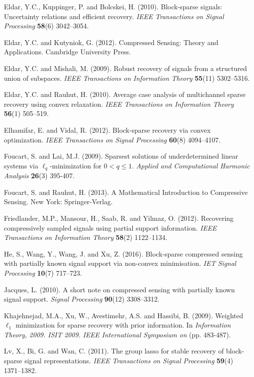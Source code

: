 \documentclass[11pt]{article}
\begin{document}
\begin{thebibliography}{}
	Eldar, Y.C., Kuppinger, P. and Bolcskei, H. (2010).
	Block-sparse signals: Uncertainty relations and efficient recovery. \textit{IEEE Transactions on Signal Processing}
	\textbf{58}(6) 3042--3054.
	
	Eldar, Y.C. and Kutyniok, G. (2012). Compressed Sensing: Theory and Applications. Cambridge University Press.
	
	Eldar, Y.C. and Mishali, M. (2009).
	Robust recovery of signals from a structured union of subspaces. \textit{IEEE Transactions on Information Theory}
	\textbf{55}(11) 5302--5316.
	
	Eldar, Y.C. and Rauhut, H. (2010). Average case analysis of multichannel sparse recovery using convex relaxation. \textit{IEEE Transactions on Information Theory} \textbf{56}(1) 505--519.
	
	Elhamifar, E. and Vidal, R. (2012). Block-sparse recovery via convex optimization. \textit{IEEE Transactions on Signal Processing}
	\textbf{60}(8) 4094--4107.
	
	Foucart, S. and Lai, M.J. (2009). Sparsest solutions of underdetermined linear systems via $\ell_q$-minimization for $0<q\leq1$. \textit{Applied and Computational Harmonic Analysis} 
	\textbf{26}(3) 395-407.
	
	Foucart, S. and Rauhut, H. (2013). A Mathematical Introduction to Compressive Sensing. New York: Springer-Verlag.
	
	Friedlander, M.P., Mansour, H., Saab, R. and Yilmaz, O. (2012). Recovering compressively sampled signals using partial support information. \textit{IEEE Transactions on Information Theory}
	\textbf{58}(2) 1122--1134.
	
	He, S., Wang, Y., Wang, J. and Xu, Z. (2016). Block-sparse compressed sensing with partially known signal support via non-convex minimisation. \textit{IET Signal Processing}
	\textbf{10}(7) 717--723.
	
	Jacques, L. (2010). A short note on compressed sensing with partially known signal support. \textit{Signal Processing}
	\textbf{90}(12) 3308--3312.
	
	Khajehnejad, M.A., Xu, W., Avestimehr, A.S. and Hassibi, B. (2009). Weighted $\ell_1$ minimization for sparse recovery with prior information. In \textit{Information Theory, 2009. ISIT 2009. IEEE International Symposium on} (pp. 483-487). 
	
	Lv, X., Bi, G. and Wan, C. (2011). The group lasso for stable recovery of block-sparse signal representations. \textit{IEEE Transactions on Signal Processing}
	\textbf{59}(4) 1371--1382.
	

\end{thebibliography}
\end{document}
